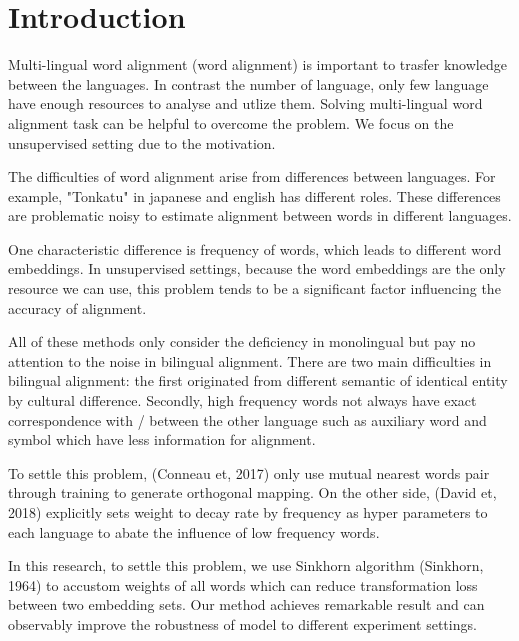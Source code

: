 \section{Introduction}
Multi-lingual word alignment (word alignment) is important to trasfer knowledge between the languages.
In contrast the number of language,
	only few language have enough resources to analyse and utlize them.
Solving multi-lingual word alignment task can be helpful to overcome the problem.
We focus on the unsupervised setting due to the motivation.

The difficulties of word alignment arise from differences between languages.
For example,
	"Tonkatu" in japanese and english has different roles.
These differences are problematic noisy to estimate alignment between words in different languages.

One characteristic difference is frequency of words,
	which leads to different word embeddings.
In unsupervised settings, 
	because the word embeddings are the only resource we can use, 
	this problem tends to be a significant factor influencing the accuracy of alignment. 

All of these methods only consider the deficiency 
	in monolingual but pay no attention to the noise in bilingual alignment. 
There are two main difficulties in bilingual alignment:
	the first originated from different semantic of identical entity by cultural difference. 
Secondly, 
	high frequency words not always have exact correspondence with / between 
	the other language such as auxiliary word and symbol which have less information for alignment. 


To settle this problem, 
	(Conneau et, 2017) only use mutual nearest words pair 
	through training to generate orthogonal mapping. 
On the other side, 
	(David et, 2018) explicitly sets weight to decay rate 
	by frequency as hyper parameters to each language 
	to abate the influence of low frequency words. 


In this research, 
	to settle this problem, 
	we use Sinkhorn algorithm (Sinkhorn, 1964) 
	to accustom weights of all words which can reduce transformation loss between two embedding sets. 
Our method achieves 
	remarkable result and can observably improve the robustness of model to different experiment settings.


